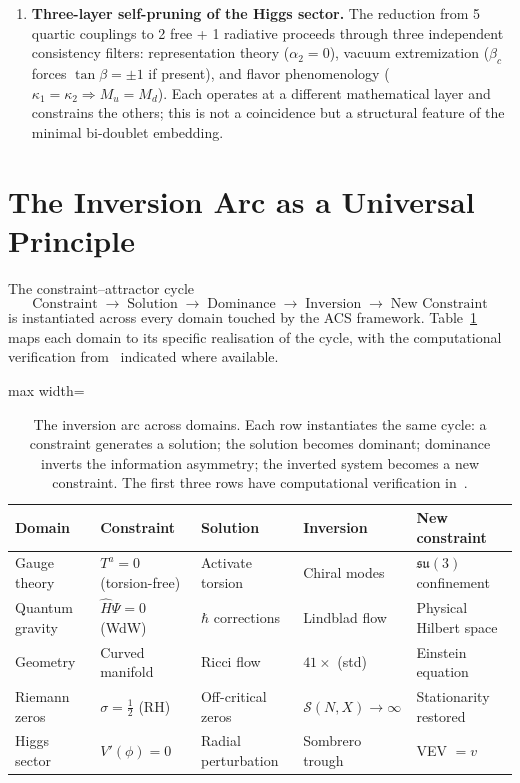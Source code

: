 \documentclass[11pt,a4paper]{article}
\theoremstyle{plain}
\theoremstyle{definition}
\theoremstyle{remark}
\begin{document}
\begin{enumerate}[label=(\arabic*)]
  \item \textbf{Three-layer self-pruning of the Higgs sector.}
    The reduction from 5 quartic couplings to 2 free + 1 radiative
    proceeds through three independent consistency filters: representation
    theory ($\alpha_2 = 0$), vacuum extremization ($\beta_c$ forces
    $\tan\beta = \pm 1$ if present), and flavor phenomenology
    ($\kappa_1 = \kappa_2 \Rightarrow M_u = M_d$).  Each operates at a
    different mathematical layer and constrains the others; this is
    not a coincidence but a structural feature of the minimal
    bi-doublet embedding.
\end{enumerate}

\section{The Inversion Arc as a Universal Principle}
\label{sec:universal}

The constraint--attractor cycle
\[
  \text{Constraint} \;\to\; \text{Solution} \;\to\;
  \text{Dominance} \;\to\; \text{Inversion} \;\to\;
  \text{New Constraint}
\]
is instantiated across every domain touched by the ACS framework.
Table~\ref{tab:inversion-universal} maps each domain to its specific
realisation of the cycle, with the computational verification
from~\cite{Wallace2026a} indicated where available.

\begin{table}[h]
\centering\small
\begin{adjustbox}{max width=\linewidth}\begin{tabular}{@{}lllll@{}}
\toprule
Domain & Constraint & Solution & Inversion & New constraint \\
\midrule
Gauge theory & $T^a = 0$ (torsion-free) & Activate torsion &
  Chiral modes & $\mathfrak{su}(3)$ confinement \\
Quantum gravity & $\hat{H}\Psi = 0$ (WdW) & $\hbar$ corrections &
  Lindblad flow & Physical Hilbert space \\
Geometry & Curved manifold & Ricci flow & $41\times$ (std) &
  Einstein equation \\
Riemann zeros & $\sigma = \tfrac{1}{2}$ (RH) & Off-critical zeros &
  $\mathcal{S}(N,X) \to \infty$ & Stationarity restored \\
Higgs sector & $V'(\phi) = 0$ & Radial perturbation &
  Sombrero trough & VEV $= v$ \\
\bottomrule
\end{tabular}\end{adjustbox}
\caption{The inversion arc across domains.  Each row instantiates the
same cycle: a constraint generates a solution; the solution becomes
dominant; dominance inverts the information asymmetry; the inverted
system becomes a new constraint.  The first three rows have
computational verification in~\cite{Wallace2026a}.}
\label{tab:inversion-universal}
\end{table}
\end{document}
